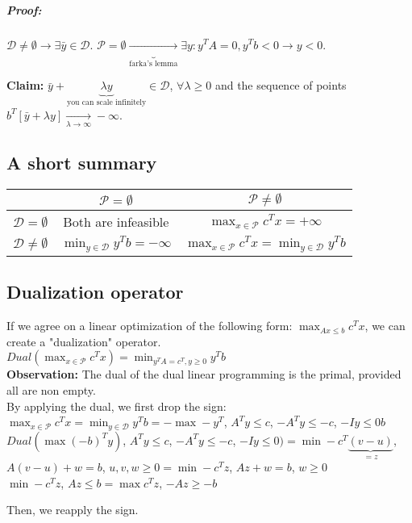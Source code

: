 \documentclass[main]{subfiles}
\begin{document}
\subparagraph{Proof:}
$\mathcal{D} \neq \emptyset \rightarrow \exists \bar{y} \in \mathcal{D}$.
$\mathcal{P} = \emptyset \underbrace{\rightarrow}_{\text{farka's lemma}} 
\exists y: y^T A = 0, y^T b < 0 \rightarrow y < 0$.

\textbf{Claim:} $\bar{y} + \underbrace{\lambda y}_{\text{you can scale
infinitely}} \in \mathcal{D}$, $\forall \lambda \geq 0$ and the sequence of
points $b^T [\bar{y} + \lambda y] \xrightarrow[\lambda \to \infty]{} -\infty$.


\subsection{A short summary}

\begin{center}
 \begin{tabular}{||c c c||} 
 \hline
 & $\mathcal{P} = \emptyset$ & $\mathcal{P} \neq \emptyset$ \\ [0.5ex] 
 \hline\hline
 $\mathcal{D} = \emptyset$ & Both are infeasible &  $\displaystyle \max_{x \in 
 \mathcal{P}} c^{T} x = +\infty$ \\ 
 \hline
 $\mathcal{D} \neq \emptyset$ & $\displaystyle \min_{y \in \mathcal{D}} y^{T}
 b = -\infty$ & $\displaystyle \max_{x \in \mathcal{P}} c^{T} x =
 \displaystyle \min_{y \in \mathcal{D}} y^{T} b$ \\
 \hline
\end{tabular}
\end{center}

\subsection{Dualization operator}
If we agree on a linear optimization of the following form: $\displaystyle 
\max_{Ax \leq b} c^{T} x$, we can create a "dualization" operator.\\

$ Dual(\displaystyle \max_{x \in \mathcal{P}} c^{T} x) = \displaystyle
\min_{y^T A = c^T, y \geq 0} y^{T} b$\\

\textbf{Observation:} The dual of the dual linear programming is the primal, 
provided all are non empty.\\

By applying the dual, we first drop the sign:\\
 $\displaystyle \max_{x \in \mathcal{P}} c^{T} x =
 \displaystyle \min_{y \in \mathcal{D}} y^{T} b =
 \displaystyle -\max -y^{T}$,  $A^T y \leq c$, $-A^T y \leq -c$, $-Iy \leq 0 b$
 \\
 
$ Dual(\displaystyle \max (-b)^{T} y)$, $A^T y \leq c$, $-A^T y \leq -c$, $-Iy
\leq 0) =  \displaystyle \min -c^{T}\underbrace{(v - u)}_{=z}$, $A(v-u)+w = b$, 
$u, v, w \geq 0 = \displaystyle \min -c^T z$, $Az + w =b$, $w \geq 0$\\
 
$\displaystyle \min -c^{T} z$, $Az \leq b = \displaystyle \max c^{T} z$, $-Az
\geq -b$

Then, we reapply the sign.
 
\end{document}
